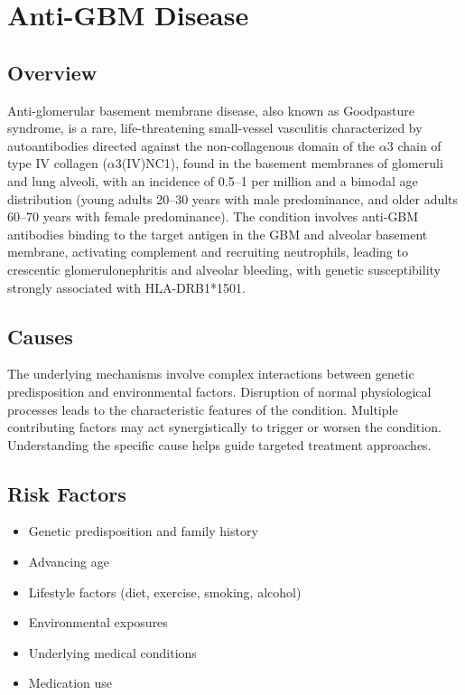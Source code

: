 \chapter{Anti-GBM Disease}
\label{sec:Anti-GBM Disease (Goodpasture Syndrome)}

\section{Overview}
Anti-glomerular basement membrane disease, also known as Goodpasture syndrome, is a rare, life-threatening small-vessel vasculitis characterized by autoantibodies directed against the non-collagenous domain of the $\alpha$3 chain of type IV collagen ($\alpha$3(IV)NC1), found in the basement membranes of glomeruli and lung alveoli, with an incidence of 0.5--1 per million and a bimodal age distribution (young adults 20--30 years with male predominance, and older adults 60--70 years with female predominance). The condition involves anti-GBM antibodies binding to the target antigen in the GBM and alveolar basement membrane, activating complement and recruiting neutrophils, leading to crescentic glomerulonephritis and alveolar bleeding, with genetic susceptibility strongly associated with HLA-DRB1*1501.
\section{Causes}
The underlying mechanisms involve complex interactions between genetic predisposition and environmental factors. Disruption of normal physiological processes leads to the characteristic features of the condition. Multiple contributing factors may act synergistically to trigger or worsen the condition. Understanding the specific cause helps guide targeted treatment approaches.
\section{Risk Factors}


\begin{itemize}[noitemsep]
  \item Genetic predisposition and family history
  \item Advancing age
  \item Lifestyle factors (diet, exercise, smoking, alcohol)
  \item Environmental exposures
  \item Underlying medical conditions
  \item Medication use
\end{itemize}

